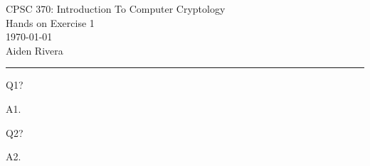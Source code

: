 \documentclass[12pt, letterpaper, onecolumn]{exam}
\begin{document}
\nopointsinmargin
\pointformat{}

\begingroup
\centering
\LARGE CPSC 370: Introduction To Computer Cryptology\\
\LARGE Hands on Exercise 1\\[0.5em]
\large \today\\[0.5em]
\large Aiden Rivera\par
\endgroup

\rule{\textwidth}{0.4pt}

\printanswers
\renewcommand{\solutiontitle}{\noindent\textbf{Ans:}\enspace}

\begin{questions}
\question[0] Q1?

\begin{solution}
A1.
\end{solution}

\question[0] Q2?

\begin{solution}
A2.
\end{solution}

\end{questions}
\end{document}
